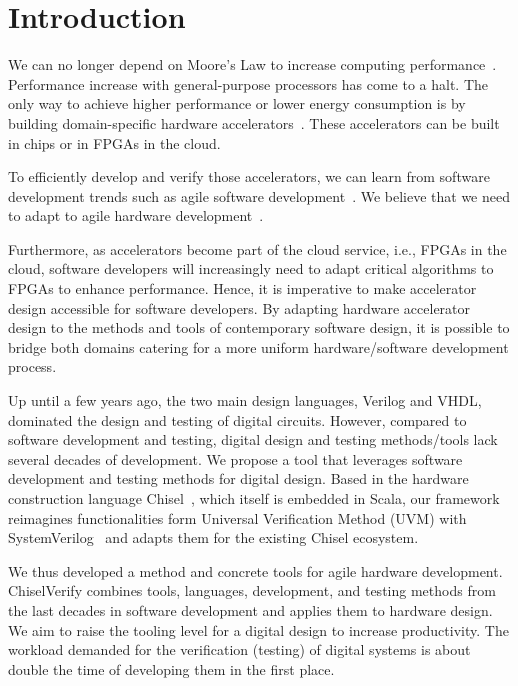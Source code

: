 \documentclass[runningheads]{llncs}
\begin{document}
\section{Introduction}
\label{sec:introduction}

We can no longer depend on Moore's Law to increase computing performance~\cite{dark-silicon:2011}.
Performance increase with general-purpose processors has come to a halt.
The only way to achieve higher performance or lower energy consumption
is by building domain-specific hardware accelerators~\cite{domain-hw-acc:2020}.
These accelerators can be built in chips or in FPGAs in the cloud.

To efficiently develop and verify those accelerators, we can learn from software development trends such as agile software development~\cite{agile:manifesto}.
We believe that we need to adapt to agile hardware development~\cite{henn-patt:turing:2019}.

Furthermore, as accelerators become part of the cloud service, i.e., FPGAs in the cloud,
software developers will increasingly need to adapt critical algorithms to FPGAs to enhance performance.
Hence, it is imperative to make accelerator design accessible for software developers.
By adapting hardware accelerator design to the methods and tools of contemporary software design,
it is possible to bridge both domains catering for a more uniform hardware/software development process.

Up until a few years ago, the two main design languages, Verilog and VHDL, dominated the
design and testing of digital circuits.
However, compared to software development and testing, digital design and testing methods/tools 
lack several decades of development. We propose a tool that
leverages software development and testing methods for digital design.
Based in the hardware construction language Chisel~\cite{chisel:dac2012}, which itself is embedded in Scala,
our framework reimagines functionalities form Universal Verification Method (UVM) with SystemVerilog~\cite{SystemVerilog} and
adapts them for the existing Chisel ecosystem.

We thus developed a method and concrete tools for agile hardware development.
ChiselVerify combines tools, languages, development, and testing methods from the last decades in
software development and applies them to hardware design.
We aim to raise the tooling level for a digital design to increase productivity.
The workload demanded for the verification (testing) of digital systems is about double the time of developing
them in the first place.
\end{document}
